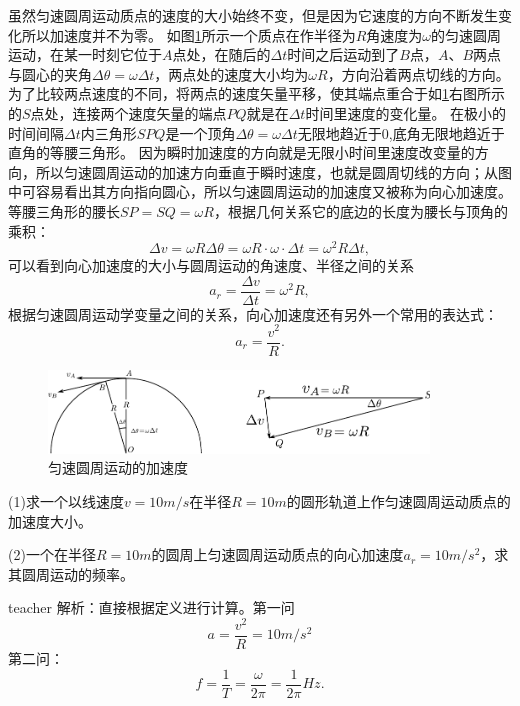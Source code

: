 虽然匀速圆周运动质点的速度的大小始终不变，但是因为它速度的方向不断发生变化所以加速度并不为零。
如图\ref{fig: motion-匀速圆周运动的加速度}所示一个质点在作半径为$R$角速度为$\omega$的匀速圆周运动，在某一时刻它位于$A$点处，在随后的$\Delta t$时间之后运动到了$B$点，$A、B$两点与圆心的夹角$\Delta\theta = \omega \Delta t$，两点处的速度大小均为$\omega R$，方向沿着两点切线的方向。
为了比较两点速度的不同，将两点的速度矢量平移，使其端点重合于如\ref{fig: motion-匀速圆周运动的加速度}右图所示的$S$点处，连接两个速度矢量的端点$PQ$就是在$\Delta t$时间里速度的变化量。
在极小的时间间隔$\Delta t$内三角形$SPQ$是一个顶角$\Delta\theta=\omega\Delta t$无限地趋近于0,底角无限地趋近于直角的等腰三角形。
因为瞬时加速度的方向就是无限小时间里速度改变量的方向，所以匀速圆周运动的加速方向垂直于瞬时速度，也就是圆周切线的方向；从图中可容易看出其方向指向圆心，所以匀速圆周运动的加速度又被称为{\heiti 向心加速度}。
等腰三角形的腰长$SP=SQ=\omega R$，根据几何关系它的底边的长度为腰长与顶角的乘积：
\[
\Delta v = \omega R \Delta \theta = \omega R\cdot \omega\cdot \Delta t=\omega^2R\Delta t,
\]
可以看到向心加速度的大小与圆周运动的角速度、半径之间的关系
\begin{equation}\label{eqn: motion-a=w^2R}
a_r = \frac{\Delta v}{\Delta t} = \omega^2R,
\end{equation}
根据匀速圆周运动学变量之间的关系，向心加速度还有另外一个常用的表达式：
\begin{equation}\label{eqn: motion-a=v^2/R}
a_r = \frac{v^2}{R}.
\end{equation}
\begin{figure}[hbtp]
\centering
\includegraphics[width=0.9\textwidth]{images/motion-17.pdf}
\caption{匀速圆周运动的加速度}\label{fig: motion-匀速圆周运动的加速度}
\end{figure}



\begin{example}
(1)求一个以线速度$v = 10 \unit{m/s}$在半径$R=10\unit{m}$的圆形轨道上作匀速圆周运动质点的加速度大小。

(2)一个在半径$R = 10\unit{m}$的圆周上匀速圆周运动质点的向心加速度$a_r = 10\unit{m/s^2}$，求其圆周运动的频率。


\begin{taggedblock}{teacher}
\noindent
解析：直接根据定义进行计算。第一问
\[a = \frac{v^2}{R} = 10\unit{m/s^2}\]
第二问：
\[
f = \frac{1}{T} = \frac{\omega}{2\pi} = \frac{1}{2\pi}\unit{Hz}.
\]
\end{taggedblock}
\end{example}





